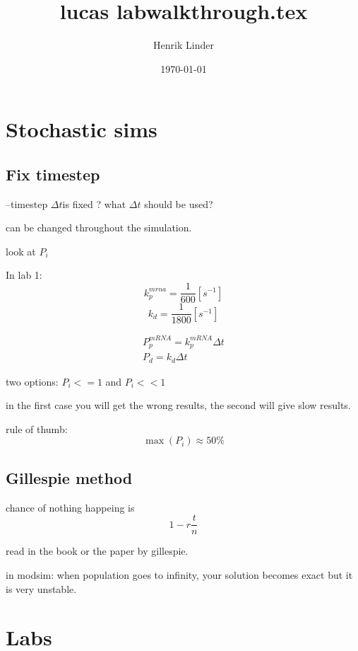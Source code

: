 \documentclass{article}
\title{lucas labwalkthrough.tex }
\author{Henrik Linder}
\date{\today}
\begin{document}
\maketitle

\section{Stochastic sims}
\subsection{Fix timestep}
--timestep $\Delta t$is fixed
? what $\Delta t$ should be used? 

can be changed throughout the simulation. 

look at $P_i$

In lab 1: 
\begin{equation}
	k_p^{mrna} = \frac{1}{600}[s^{-1}]
\end{equation}
\begin{equation}
	k_d = \frac{1}{1800}[s^{-1}]
\end{equation}

\begin{equation}
	\begin{split}
	P_p^{mRNA} = k_p^{mRNA}\Delta t\\
	P_d = k_d\Delta t
	\end{split}
\end{equation}

two options: $P_i <= 1$ and $P_i << 1$

in the first case you will get the wrong results, the second will give slow results.

rule of thumb: 
\begin{equation}
	\max (P_i) \approx 50\%
\end{equation}

\subsection{Gillespie method}
chance of nothing happeing is 
\begin{equation}
	1 - r \frac{t}{n}
\end{equation}

read in the book or the paper by gillespie. 


in modsim: when population goes to infinity, your solution becomes exact but it is very unstable.



\section{Labs}
\end{document}
